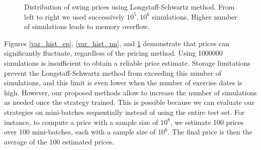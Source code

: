 \documentclass{article}
\numberwithin{equation}{section}
\begin{document}
\begin{figure}[ht!]
  \begin{subfigure}[b]{0.2\textwidth}
\end{subfigure}
\hspace*{1.3cm}
\begin{subfigure}[b]{0.2\textwidth}
\end{subfigure}

\caption{Distribution of swing prices using Longstaff-Schwartz method. From left to right we used successively $10^{5}, 10^{6}$ simulations. Higher number of simulations leads to memory overflow.}
\label{var_hist_ls}
\end{figure}


Figures \ref{var_hist_ep}, \ref{var_hist_nn}, and \ref{var_hist_ls} demonstrate that prices can significantly fluctuate, regardless of the pricing method. Using 1000000 simulations is insufficient to obtain a reliable price estimate. Storage limitations prevent the Longstaff-Schwartz method from exceeding this number of simulations, and this limit is even lower when the number of exercise dates is high. However, our proposed methods allow to increase the number of simulations as needed once the strategy trained. This is possible because we can evaluate our strategies on mini-batches sequentially instead of using the entire test set. For instance, to compute a price with a sample size of $10^8$, we estimate 100 prices over 100 mini-batches, each with a sample size of $10^6$. The final price is then the average of the 100 estimated prices.
\end{document}
